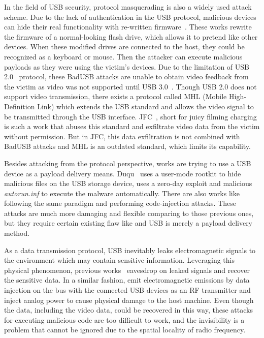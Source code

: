 In the field of USB security, protocol masquerading is also a widely used
attack scheme. Due to the lack of authentication in the USB protocol, malicious
devices can hide their real functionality with re-written
firmware~\cite{rubber,badusb,rubberducky2020,usbbypassing,iseeyou,usbdriver}.
These works rewrite the firmware of a normal-looking flash drive, which allows
it to pretend like other devices. When these modified drives are connected to the
host, they could be recognized as a keyboard or mouse. Then the attacker can
execute malicious payloads as they were using the victim's devices. Due to the
limitation of USB 2.0~\cite{usb20} protocol, these BadUSB
attacks\cite{badusb} are unable to obtain video feedback from the victim
as video was not supported until USB 3.0~\cite{usb30}. Though USB 2.0 does not
support video transmission, there exists a protocol called MHL (Mobile
High-Definition Link) which extends the USB standard and allows the video signal to
be transmitted through the USB interface. JFC~\cite{JFC}, short for juicy filming
charging is such a work that abuses this standard and exfiltrate video data
from the victim without permission. But in JFC, this data exfiltration is not
combined with BadUSB attacks and MHL is an outdated standard, which limits its
capability.

Besides attacking from the protocol perspective, works are trying to use a
USB device as a payload delivery means. Duqu~\cite{duqu} uses a user-mode
rootkit to hide malicious files on the USB storage device, \cite{flame} uses a
zero-day exploit and malicious \textit{autorun.inf} to execute the malware
automatically. There are also works like \cite{brain,stuxnet,conficker}
following the same paradigm and performing code-injection attacks. These
attacks are much more damaging and flexible comparing to those previous ones,
but they require certain existing flaw like \cite{zero-day} and USB is merely
a payload delivery method.

As a data transmission protocol, USB inevitably leaks electromagnetic signals
to the environment which may contain sensitive information. Leveraging this
physical phenomenon, previous works~\cite{smartphone,
poweremi,revealing,su2017usb,usbgpslocator,bates2014leveraging,badusbhub,usbfinger,side,usbdriver}
eavesdrop on leaked signals and recover the sensitive data. In a similar fashion,
\cite{usbee,turnip} emit electromagnetic emissions by data injection on the bus
with the connected USB devices as an RF transmitter and \cite{usbkiller,cable}
inject analog
power to cause physical damage to the host machine. Even though the data,
including the video data, could be recovered in this way, these attacks for
executing malicious code are too difficult to work, and the invisibility is a
problem that cannot be ignored due to the spatial locality of radio frequency.

